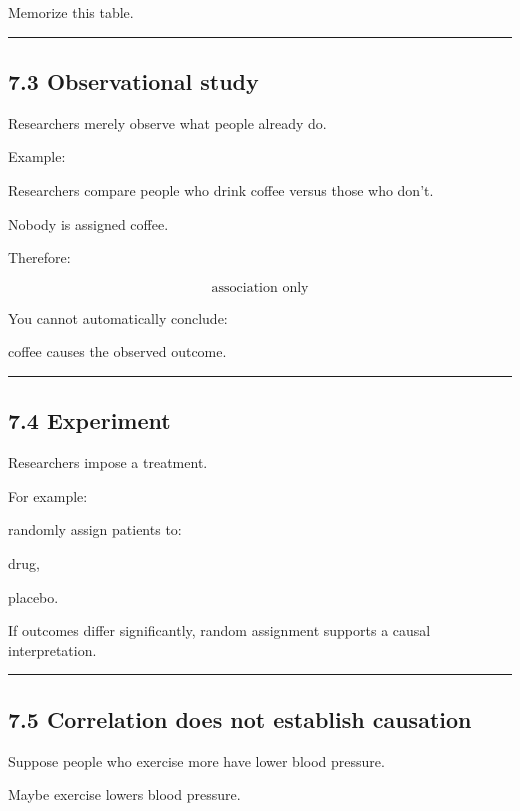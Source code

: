 \documentclass[
]{article}
\begin{document}
Memorize this table.

\begin{center}\rule{0.5\linewidth}{0.5pt}\end{center}

\subsection{7.3 Observational study}\label{observational-study}

Researchers merely observe what people already do.

Example:

Researchers compare people who drink coffee versus those who don't.

Nobody is assigned coffee.

Therefore:

\[
\boxed{\text{association only}}
\]

You cannot automatically conclude:

coffee causes the observed outcome.

\begin{center}\rule{0.5\linewidth}{0.5pt}\end{center}

\subsection{7.4 Experiment}\label{experiment}

Researchers impose a treatment.

For example:

randomly assign patients to:

drug,

placebo.

If outcomes differ significantly, random assignment supports a causal
interpretation.

\begin{center}\rule{0.5\linewidth}{0.5pt}\end{center}

\subsection{7.5 Correlation does not establish
causation}\label{correlation-does-not-establish-causation}

Suppose people who exercise more have lower blood pressure.

Maybe exercise lowers blood pressure.
\end{document}
